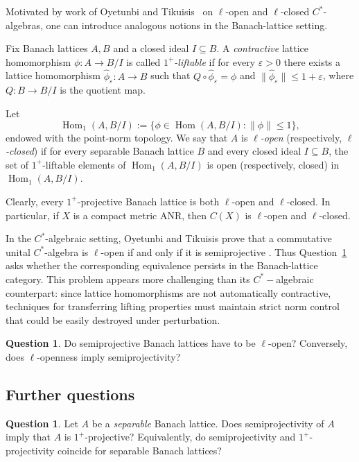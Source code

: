 \documentclass[11pt]{amsart}
\renewcommand{\le}{\leqslant}
\numberwithin{equation}{section}
\theoremstyle{definition}
\newtheorem{question}[theorem]{Question}
\theoremstyle{remark}
\theoremstyle{plain}
\DeclareMathOperator{\Hom}{Hom}
\begin{document}
Motivated by work of Oyetunbi and Tikuisis~\cite{oyetunbi-tikuisis}
on $\ell$-open and $\ell$-closed $C^*$-algebras,
one can introduce analogous notions in the Banach-lattice setting.

Fix Banach lattices $A,B$ and a closed ideal $I\subseteq B$.
A \emph{contractive} lattice homomorphism $\phi\colon A\to B/I$ is called
\emph{$1^+$-liftable} if for every $\varepsilon>0$ there exists a lattice homomorphism
$\widehat\phi_\varepsilon\colon A\to B$ such that $Q\circ \widehat\phi_\varepsilon=\phi$ and
$\|\widehat\phi_\varepsilon\|\le 1+\varepsilon$, where $Q\colon B\to B/I$ is the quotient map.

Let
\[
\Hom_1(A,B/I):=\bigl\{\phi\in\Hom(A,B/I): \|\phi\|\le 1\bigr\},
\]
endowed with the point-norm topology.
We say that $A$ is \emph{$\ell$-open} (respectively, \emph{$\ell$-closed}) if for every
separable Banach lattice $B$ and every closed ideal $I\subseteq B$, the set of
$1^+$-liftable elements of $\Hom_1(A,B/I)$ is open
(respectively, closed) in $\Hom_1(A,B/I)$.

Clearly, every $1^+$-projective Banach lattice is both $\ell$-open and $\ell$-closed.
In particular, if $X$ is a compact metric ANR, then $C(X)$ is $\ell$-open and $\ell$-closed.

In the \(C^*\)-algebraic setting, Oyetunbi and Tikuisis prove that a commutative unital
\(C^*\)-algebra is \(\ell\)-open if and only if it is semiprojective \cite{oyetunbi-tikuisis}.
Thus Question~\ref{q:l-open} asks whether the corresponding equivalence persists
in the Banach-lattice category. This problem appears more challenging than its $C^*-$algebraic counterpart: since lattice homomorphisms are not automatically contractive, techniques for transferring lifting properties must maintain strict norm control that could be easily destroyed under perturbation.

\begin{question}\label{q:l-open}
Do semiprojective Banach lattices have to be $\ell$-open?
Conversely, does $\ell$-openness imply semiprojectivity?
\end{question}

\subsection*{Further questions}

\begin{question}\label{q:separable-equivalence}
Let $A$ be a \emph{separable} Banach lattice.
Does semiprojectivity of $A$ imply that $A$ is $1^+$-projective?
Equivalently, do semiprojectivity and $1^+$-projectivity coincide for separable Banach lattices?
\end{question}
\end{document}
